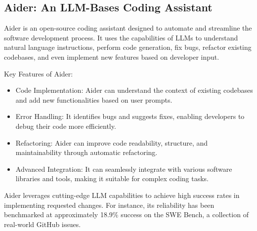 \subsection{Aider: An LLM-Bases Coding Assistant}
Aider is an open-source coding assistant designed to automate and streamline the software development process. It uses the capabilities of LLMs to understand natural language instructions, perform code generation, fix bugs, refactor existing codebases, and even implement new features based on developer input.

Key Features of Aider:

\begin{itemize}
    \item Code Implementation: Aider can understand the context of existing codebases and add new functionalities based on user prompts.
    \item Error Handling: It identifies bugs and suggests fixes, enabling developers to debug their code more efficiently.
    \item Refactoring: Aider can improve code readability, structure, and maintainability through automatic refactoring.
    \item Advanced Integration: It can seamlessly integrate with various software libraries and tools, making it suitable for complex coding tasks.
\end{itemize}
Aider leverages cutting-edge LLM capabilities to achieve high success rates in implementing requested changes. For instance, its reliability has been benchmarked at approximately 18.9\% success on the SWE Bench, a collection of real-world GitHub issues.


